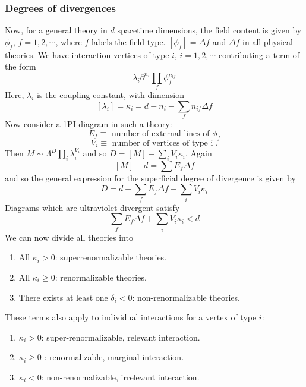 \subsubsection{Degrees of divergences}
Now, for a general theory in $d$ spacetime dimensions, the field content is given by $\phi_f$, $f=1,2,\cdots$, where $f$ labels
the field type. $[\phi_f]=\Delta f$ and $\Delta f$ in all physical theories. We have interaction vertices of type $i$, $i = 1,2,\cdots$
contributing a term of the form
\[\lambda_i \partial^{n_i} \prod_f \phi_f^{n_{if}}\]
Here, $\lambda_i$ is the coupling constant, with dimension
\[[\lambda_i] = \kappa_i = d - n_i - \sum_f n_{if}\Delta f \]
Now consider a 1PI diagram in such a theory:
\[E_f \equiv \mbox{ number of external lines of } \phi_f\]
\[V_i \equiv \mbox{ number of vertices of type i }.\]
Then $M \sim \Lambda^D \prod_i \lambda_i ^{V_i}$ and so $D = [M] - \sum_i V_i \kappa_i$. Again
\[[M] - d = \sum E_f \Delta f\]
and so the general expression for the superficial degree of divergence is given by
\[D = d - \sum_f E_f \Delta f - \sum_i V_i \kappa_i\]
Diagrams which are ultraviolet divergent satisfy
\[\sum_f E_f \Delta f + \sum_i V_i \kappa_i < d\]
We can now divide all theories into
\begin{enumerate}
\item All $\kappa_i > 0$: superrenormalizable theories.
\item All $\kappa_i \geq 0$: renormalizable theories.
\item There exists at least one $\delta_i < 0$: non-renormalizable theories.
\end{enumerate}
These terms also apply to individual interactions for a vertex of type $i$:
\begin{enumerate}
\item $\kappa_i > 0$: super-renormalizable, relevant interaction.
\item $\kappa_i \geq 0$ : renormalizable, marginal interaction.
\item $\kappa_i < 0$: non-renormalizable, irrelevant interaction.
\end{enumerate}


